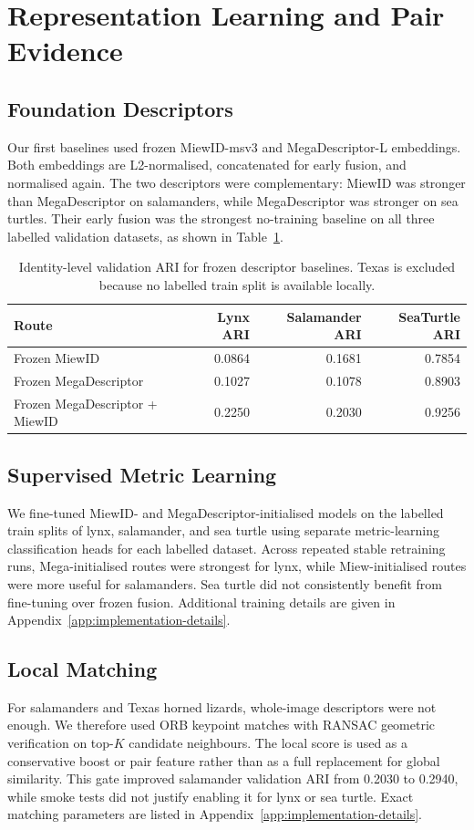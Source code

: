 \documentclass{ceurart}
\begin{document}
\section{Representation Learning and Pair Evidence}
\subsection{Foundation Descriptors}
Our first baselines used frozen MiewID-msv3 and MegaDescriptor-L embeddings. Both embeddings are L2-normalised, concatenated for early fusion, and normalised again. The two descriptors were complementary: MiewID was stronger than MegaDescriptor on salamanders, while MegaDescriptor was stronger on sea turtles. Their early fusion was the strongest no-training baseline on all three labelled validation datasets, as shown in Table~\ref{tab:baselines}.

\begin{table}[t]
  \centering
  \caption{Identity-level validation ARI for frozen descriptor baselines. Texas is excluded because no labelled train split is available locally.}
  \label{tab:baselines}
  \begin{tabular}{lrrr}
    \toprule
    Route & Lynx ARI & Salamander ARI & SeaTurtle ARI \\
    \midrule
    Frozen MiewID & 0.0864 & 0.1681 & 0.7854 \\
    Frozen MegaDescriptor & 0.1027 & 0.1078 & 0.8903 \\
    Frozen MegaDescriptor + MiewID & 0.2250 & 0.2030 & 0.9256 \\
    \bottomrule
  \end{tabular}
\end{table}

\subsection{Supervised Metric Learning}
We fine-tuned MiewID- and MegaDescriptor-initialised models on the labelled train splits of lynx, salamander, and sea turtle using separate metric-learning classification heads for each labelled dataset. Across repeated stable retraining runs, Mega-initialised routes were strongest for lynx, while Miew-initialised routes were more useful for salamanders. Sea turtle did not consistently benefit from fine-tuning over frozen fusion. Additional training details are given in Appendix~\ref{app:implementation-details}.

\subsection{Local Matching}
For salamanders and Texas horned lizards, whole-image descriptors were not enough. We therefore used ORB keypoint matches \cite{orb} with RANSAC geometric verification \cite{ransac} on top-$K$ candidate neighbours. The local score is used as a conservative boost or pair feature rather than as a full replacement for global similarity. This gate improved salamander validation ARI from 0.2030 to 0.2940, while smoke tests did not justify enabling it for lynx or sea turtle. Exact matching parameters are listed in Appendix~\ref{app:implementation-details}.
\end{document}
